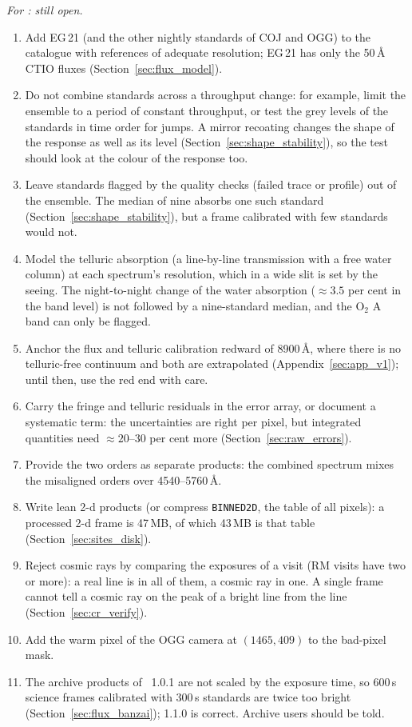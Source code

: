 \textit{For \banzai{}: still open.}
\begin{enumerate}
\item Add EG\,21 (and the other nightly standards of COJ and OGG) to the catalogue with references of adequate
resolution; EG\,21 has only the 50\,\AA{} CTIO fluxes (Section~\ref{sec:flux_model}).
\item Do not combine standards across a throughput change: for example, limit the ensemble to a period of constant
throughput, or test the grey levels of the standards in time order for jumps. A mirror recoating changes the shape of
the response as well as its level (Section~\ref{sec:shape_stability}), so the test should look at the colour of the
response too.
\item Leave standards flagged by the quality checks (failed trace or profile) out of the ensemble. The median of nine
absorbs one such standard (Section~\ref{sec:shape_stability}), but a frame calibrated with few standards would not.
\item Model the telluric absorption (a line-by-line transmission with a free water column) at each spectrum's
resolution, which in a wide slit is set by the seeing. The night-to-night change of the water absorption
($\approx3.5$ per cent in the band level) is not followed by a nine-standard median, and the O$_2$ A band can only be
flagged.
\item Anchor the flux and telluric calibration redward of 8900\,\AA, where there is no telluric-free continuum and
both are extrapolated (Appendix~\ref{sec:app_v1}); until then, use the red end with care.
\item Carry the fringe and telluric residuals in the error array, or document a systematic term: the uncertainties
are right per pixel, but integrated quantities need $\approx20$--30 per cent more (Section~\ref{sec:raw_errors}).
\item Provide the two orders as separate products: the combined spectrum mixes the misaligned orders over
4540--5760\,\AA.
\item Write lean 2-d products (or compress \texttt{BINNED2D}, the table of all pixels): a processed 2-d frame is 47\,MB, of which
43\,MB is that table (Section~\ref{sec:sites_disk}).
\item Reject cosmic rays by comparing the exposures of a visit (RM visits have two or more): a real line is in all of
them, a cosmic ray in one. A single frame cannot tell a cosmic ray on the peak of a bright line from the line
(Section~\ref{sec:cr_verify}).
\item Add the warm pixel of the OGG camera at $(1465,409)$ to the bad-pixel mask.
\item The archive products of \banzai{}~1.0.1 are not scaled by the exposure time, so 600\,s science frames calibrated
with 300\,s standards are twice too bright (Section~\ref{sec:flux_banzai}); 1.1.0 is correct. Archive users should be
told.
\end{enumerate}
